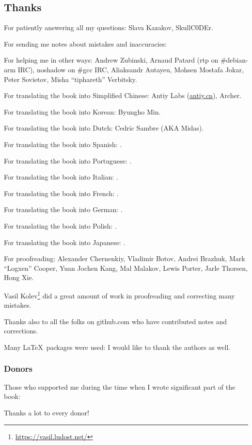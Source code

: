 \subsection*{Thanks}

For patiently answering all my questions: Slava  Kazakov, SkullC0DEr.

For sending me notes about mistakes and inaccuracies: \PeopleMistakesInaccuracies{}

For helping me in other ways:
Andrew Zubinski,
Arnaud Patard (rtp on \#debian-arm IRC),
noshadow on \#gcc IRC,
Aliaksandr Autayeu,
Mohsen Mostafa Jokar,
Peter Sovietov,
Misha ``tiphareth'' Verbitsky.

For translating the book into Simplified Chinese:
Antiy Labs (\href{http://antiy.cn}{antiy.cn}), Archer.

For translating the book into Korean: Byungho Min.

For translating the book into Dutch: Cedric Sambre (AKA Midas).

For translating the book into Spanish: \PeopleSpanishTranslators{}.

For translating the book into Portuguese: \PeoplePTBRTranslators{}.

For translating the book into Italian: \PeopleItalianTranslators{}.

For translating the book into French: \PeopleFrenchTranslators{}.

For translating the book into German: \PeopleGermanTranslators{}.

For translating the book into Polish: \PeoplePolishTranslators{}.

For translating the book into Japanese: \PeopleJapaneseTranslators{}.

For proofreading:
Alexander  Chernenkiy,
Vladimir Botov,
Andrei Brazhuk,
Mark ``Logxen'' Cooper, Yuan Jochen Kang, Mal Malakov, Lewis Porter, Jarle Thorsen, Hong Xie.

Vasil Kolev\footnote{\url{https://vasil.ludost.net/}} did a great amount of work in proofreading and correcting many mistakes.

Thanks also to all the folks on github.com who have contributed notes and corrections\FNGithubContributors{}.

Many \LaTeX\ packages were used: I would like to thank the authors as well.

\subsubsection*{Donors}

Those who supported me during the time when I wrote significant part of the book:



Thanks a lot to every donor!
